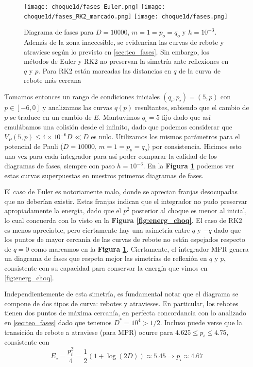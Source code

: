\begin{figure}[H]
	\centering	%
	\texttt{[image: choque1d/fases\_Euler.png]}
	\texttt{[image: choque1d/fases\_RK2\_marcado.png]}
	\texttt{[image: choque1d/fases.png]}
	\caption{Diagrama de fases para $D=10000$, $m=1=p_o=q_o$ y $h=10^{-3}$. Además de la zona inaccesible, se evidencian las curvas de rebote y atraviese según lo previsto en \ref{sec:teo_fases}.
		Sin embargo, los métodos de Euler y RK2 no preservan la simetría ante reflexiones en $q$ y $p$.
		Para RK2 están marcadas las distancias en $q$ de la curva de rebote más cercana}
	\label{fig:ej_diag_fases}
\end{figure}

Tomamos entonces un rango de condiciones iniciales $(q_i,p_i)=(5,p)$ con $p\in [-6,0]$ y analizamos las curvas $q(p)$ resultantes, sabiendo que el cambio de $p$ se traduce en un cambio de $E$.
Mantuvimos $q_i=5$ fijo dado que así emulábamos una colisión desde el infinito, dado que podemos considerar que $V_P(5,p)\leq 4\times10^{-6}D \ll D$ es nulo.
Utilizamos los mismos parámetros para el potencial de Pauli ($D=10000$, $m=1=p_o=q_o$) por consistencia.
Hicimos esto una vez para cada integrador para así poder comparar la calidad de los diagramas de fases, siempre con paso $h=10^{-3}$.
En la \textbf{Figura \ref{fig:ej_diag_fases}} podemos ver estas curvas superpuestas en nuestros primeros diagramas de fases.

El caso de Euler es notoriamente malo, donde se aprecian franjas desocupadas que no deberían existir.
Estas franjas indican que el integrador no pudo preservar apropiadamente la energía, dado que el $p^2$ posterior al choque es menor al inicial, lo cual concuerda con lo visto en la \textbf{Figura \ref{fig:energ_choq}}.
El caso de RK2 es menos apreciable, pero ciertamente hay una asimetría entre $q$ y $-q$ dado que los puntos de mayor cercanía de las curvas de rebote no están espejados respecto de $q=0$ como marcamos en la \textbf{Figura \ref{fig:ej_diag_fases}}.
Ciertamente, el integrador MPR genera un diagrama de fases que respeta mejor las simetrías de reflexión en $q$ y $p$, consistente con su capacidad para conservar la energía que vimos en \ref{fig:energ_choq}.

Independientemente de esta simetría, es fundamental notar que el diagrama se compone de dos tipos de curva: rebotes y atravieses.
En particular, los rebotes tienen dos puntos de máxima cercanía, en perfecta concordancia con lo analizado en \ref{sec:teo_fases} dado que tenemos $D^*=10^4>1/2$.
Incluso puede verse que la transición de rebote a atraviese (para MPR) ocurre para $4.625\leq p_i\leq4.75$, consistente con
\[ E_c = \frac{p_i^2}{4} = \frac{1}{2}\left( 1 + \log(2D) \right) \approx 5.45 \Longrightarrow p_i \approx 4.67 \]

